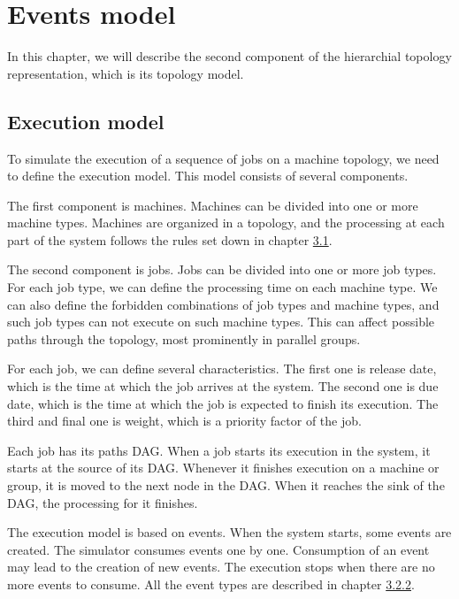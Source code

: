 \chapter{Events model}
\label{sec:events_model}

In this chapter, we will describe the second component of the hierarchial topology representation, which is its topology model.

\section{Execution model}
\label{sec:execution_model}

To simulate the execution of a sequence of jobs on a machine topology, we need to define the execution model. This model consists of several components.

The first component is machines. Machines can be divided into one or more machine types. Machines are organized in a topology, and the processing at each part of the system follows the rules set down in chapter \hyperref[sec:topology_model]{3.1}.

The second component is jobs. Jobs can be divided into one or more job types. For each job type, we can define the processing time on each machine type. We can also define the forbidden combinations of job types and machine types, and such job types can not execute on such machine types. This can affect possible paths through the topology, most prominently in parallel groups.

For each job, we can define several characteristics. The first one is release date, which is the time at which the job arrives at the system. The second one is due date, which is the time at which the job is expected to finish its execution. The third and final one is weight, which is a priority factor of the job.

Each job has its paths DAG. When a job starts its execution in the system, it starts at the source of its DAG. Whenever it finishes execution on a machine or group, it is moved to the next node in the DAG. When it reaches the sink of the DAG, the processing for it finishes.

The execution model is based on events. When the system starts, some events are created. The simulator consumes events one by one. Consumption of an event may lead to the creation of new events. The execution stops when there are no more events to consume. All the event types are described in chapter \hyperref[sec:event_types]{3.2.2}.

